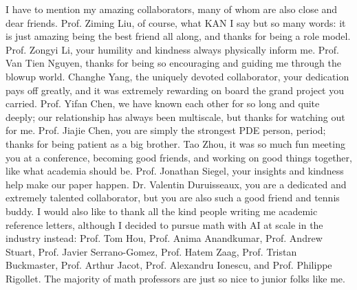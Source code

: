 \documentclass[12pt]{caltech_thesis}
\numberwithin{equation}{section}
\begin{document}
\begin{acknowledgements}
I have to mention my amazing collaborators, many of whom are also close and dear friends. Prof. Ziming Liu, of course, what KAN I say but so many words: it is just amazing being the best friend all along, and thanks for being a role model. Prof. Zongyi Li, your humility and kindness always physically inform me. Prof. Van Tien Nguyen, thanks for being so encouraging and guiding me through the blowup world. Changhe Yang, the uniquely devoted collaborator, your dedication pays off greatly, and it was extremely rewarding on board the grand project you carried. Prof. Yifan Chen, we have known each other for so long and quite deeply; our relationship has always been multiscale, but thanks for watching out for me. Prof. Jiajie Chen, you are simply the strongest PDE person, period; thanks for being patient as a big brother. Tao Zhou, it was so much fun meeting you at a conference, becoming good friends, and working on good things together, like what academia should be. Prof. Jonathan Siegel, your insights and kindness help make our paper happen.
Dr. Valentin Duruisseaux, you are a dedicated and extremely talented collaborator, but you are also such a good friend and tennis buddy. I would also like to thank all the kind people writing me academic reference letters, although I decided to pursue math with AI at scale in the industry instead: Prof. Tom Hou, Prof. Anima Anandkumar, Prof. Andrew Stuart, Prof. Javier Serrano-Gomez, Prof. Hatem Zaag, Prof. Tristan Buckmaster, Prof. Arthur Jacot, Prof. Alexandru Ionescu, and Prof. Philippe Rigollet. The majority of math professors are just so nice to junior folks like me.


\end{acknowledgements}
\end{document}
